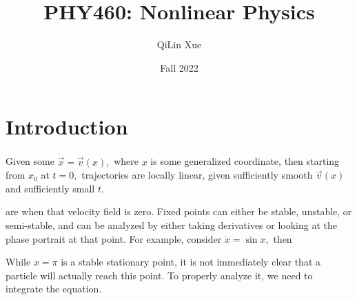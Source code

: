 \documentclass{article}
\title{PHY460: Nonlinear Physics}
\author{QiLin Xue}
\date{Fall 2022}
\numberwithin{equation}{section}
\begin{document}
\maketitle
\tableofcontents
\newpage
\section{Introduction}
Given some $\dot{\vec{x}}=\vec{v}(x),$ where $x$ is some generalized coordinate, then starting from $x_0$ at $t=0,$ trajectories are locally linear, given sufficiently smooth $\vec{v}(x)$ and sufficiently small $t.$

 are when that velocity field is zero. Fixed points can either be stable, unstable, or semi-stable, and can be analyzed by either taking derivatives or looking at the phase portrait at that point. For example, consider $\dot{x}=\sin x,$ then
\begin{center}
\end{center}
While $x=\pi$ is a stable stationary point, it is not immediately clear that a particle will actually reach this point. To properly analyze it, we need to integrate the equation.
\end{document}
